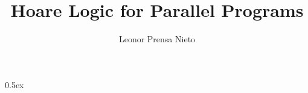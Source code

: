 \documentclass[11pt,a4paper]{book}
\begin{document}
\title{Hoare Logic for Parallel Programs}
\author{Leonor Prensa Nieto}
\maketitle

\pagestyle{plain}
\thispagestyle{empty}
\tableofcontents

\parindent 0pt\parskip 0.5ex


%
%
\end{document}
